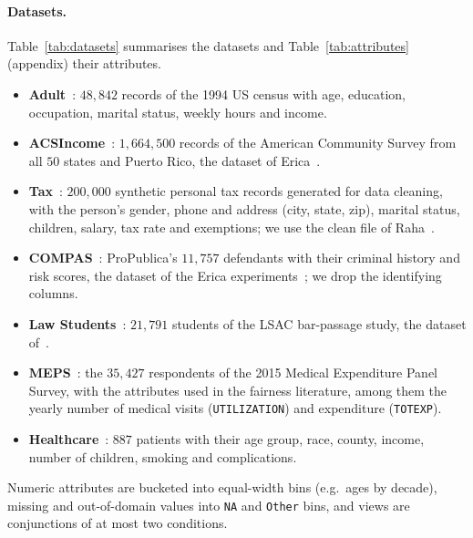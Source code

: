 \paragraph{Datasets.}
Table~\ref{tab:datasets} summarises the datasets and Table~\ref{tab:attributes} (appendix) their attributes.
\begin{itemize}[leftmargin=*,itemsep=1pt,topsep=2pt]
  \item \textbf{Adult}~\cite{adult-uci}: $48{,}842$ records of the 1994 US census with age, education, occupation, marital status, weekly hours and income.
  \item \textbf{ACSIncome}~\cite{DingHMS21}: $1{,}664{,}500$ records of the American Community Survey from all $50$ states and Puerto Rico, the dataset of Erica~\cite{LMSJ23,ERICA}.
  \item \textbf{Tax}~\cite{BohannonFGJK07}: $200{,}000$ synthetic personal tax records generated for data cleaning, with the person's gender, phone and address (city, state, zip), marital status, children, salary, tax rate and exemptions; we use the clean file of Raha~\cite{MahdaviAFMOST19}.
  \item \textbf{COMPAS}~\cite{compas-propublica}: ProPublica's $11{,}757$ defendants with their criminal history and risk scores, the dataset of the Erica experiments~\cite{ERICA}; we drop the identifying columns.
  \item \textbf{Law Students}~\cite{lsac-wightman98}: $21{,}791$ students of the LSAC bar-passage study, the dataset of~\cite{CSSM24}.
  \item \textbf{MEPS}~\cite{meps-hc181}: the $35{,}427$ respondents of the 2015 Medical Expenditure Panel Survey, with the attributes used in the fairness literature, among them the yearly number of medical visits (\texttt{UTILIZATION}) and expenditure (\texttt{TOTEXP}).
  \item \textbf{Healthcare}~\cite{ERICA}: $887$ patients with their age group, race, county, income, number of children, smoking and complications.
\end{itemize}
Numeric attributes are bucketed into equal-width bins (e.g.\ ages by decade), missing and out-of-domain values into \texttt{NA} and \texttt{Other} bins, and views are conjunctions of at most two conditions.

